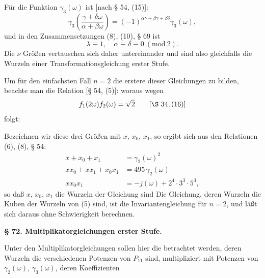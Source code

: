 Für die Funktion $\gamma_3(\omega)$ ist [nach § 54, (15)]:
\[
\gamma_3\left(\frac{\gamma+\delta\omega}{\alpha+\beta\omega}\right) = (-1)^{\alpha\gamma+\beta\gamma+\beta\delta} \gamma_3(\omega),
\]
und in den Zusammensetzungen (8), (10), § 69 ist
\[
\lambda \equiv 1, \quad \alpha \equiv \delta \equiv 0 \ (\mathrm{mod}\ 2).
\]
Die $\nu$ Größen
vertauschen sich daher untereinander und sind also gleichfalls die
Wurzeln einer Transformationsgleichung erster Stufe.

Um für den einfachsten Fall $n=2$ die erstere dieser Gleichungen zu
bilden, beachte man die Relation [§ 54, (5)]:
woraus wegen
\[
f_1(2\omega) f_2(\omega) = \sqrt{2} \qquad [\S\ 34, (16)]
\]
folgt:

Bezeichnen wir diese drei Größen mit $x$, $x_0$, $x_1$, so ergibt
sich aus den Relationen (6), (8), § 54:
\[
\begin{aligned}
x + x_0 + x_1 &= \gamma_2(\omega)^2 \\
xx_0 + xx_1 + x_0x_1 &= 495\,\gamma_2(\omega) \\
xx_0x_1 &= -j(\omega) + 2^4\cdot3^3\cdot5^3,
\end{aligned}
\]
so daß $x$, $x_0$, $x_1$ die Wurzeln der Gleichung sind
Die Gleichung, deren Wurzeln die Kuben der Wurzeln von (5) sind, ist
die Invariantengleichung für $n=2$, und läßt sich daraus ohne
Schwierigkeit berechnen.

\begin{center}
\textbf{§ 72. Multiplikatorgleichungen erster Stufe.}
\end{center}

Unter den Multiplikatorgleichungen sollen hier die betrachtet werden,
deren Wurzeln die verschiedenen Potenzen von $P_{11}$ sind,
multipliziert mit Potenzen von $\gamma_2(\omega)$, $\gamma_3(\omega)$,
deren Koeffizienten
